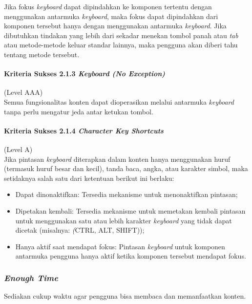 Jika fokus \textit{keyboard} dapat dipindahkan ke komponen tertentu dengan menggunakan antarmuka \textit{keyboard}, maka fokus dapat dipindahkan dari komponen tersebut hanya dengan menggunakan antarmuka \textit{keyboard}. Jika dibutuhkan tindakan yang lebih dari sekadar menekan tombol panah atau \textit{tab} atau metode-metode keluar standar lainnya, maka pengguna akan diberi tahu tentang metode tersebut.

\paragraph{Kriteria Sukses 2.1.3 \textit{Keyboard (No Exception)}}
\label{sec:kriteria_sukses_2.1.3}
(Level AAA)\\

Semua fungsionalitas konten dapat dioperasikan melalui antarmuka \textit{keyboard} tanpa perlu mengatur jeda antar ketukan tombol.

\paragraph{Kriteria Sukses 2.1.4 \textit{Character Key Shortcuts}}
\label{sec:kriteria_sukses_2.1.4}
(Level A)\\

Jika pintasan \textit{keyboard} diterapkan dalam konten hanya menggunakan huruf (termasuk huruf besar dan kecil), tanda baca, angka, atau karakter simbol, maka setidaknya salah satu dari ketentuan berikut ini berlaku:
\begin{itemize}
	\item Dapat dinonaktifkan: Tersedia mekanisme untuk menonaktifkan pintasan;
	\item Dipetakan kembali: Tersedia mekanisme untuk memetakan kembali pintasan untuk menggunakan satu atau lebih karakter \textit{keyboard} yang tidak dapat dicetak (misalnya: \textit(CTRL, ALT, SHIFT));
	\item Hanya aktif saat mendapat fokus: Pintasan \textit{keyboard} untuk komponen antarmuka pengguna hanya aktif ketika komponen tersebut mendapat fokus.
\end{itemize}

\subsubsection{\textit{Enough Time}}
\label{sec:enough_time}
Sediakan cukup waktu agar pengguna bisa membaca dan memanfaatkan konten.

